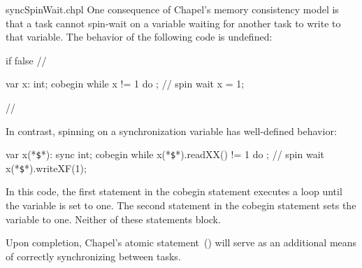 \begin{chapelexample}{syncSpinWait.chpl}
One consequence of Chapel's memory consistency model is that a task cannot spin-wait on a
variable waiting for another task to write to that variable.  The behavior of
the following code is undefined:

\begin{chapelpre}
if false { // }
\end{chapelpre}
\begin{chapel}
var x: int;
cobegin {
  while x != 1 do ;  // spin wait
  x = 1;
}
\end{chapel}
\begin{chapelnoprint}
// {
}
\end{chapelnoprint}
In contrast, spinning on a synchronization variable has well-defined
behavior:
\begin{chapel}
var x(*\texttt{\$}*): sync int;
cobegin {
  while x(*\texttt{\$}*).readXX() != 1 do ;  // spin wait
  x(*\texttt{\$}*).writeXF(1);
}
\end{chapel}
\begin{chapeloutput}
\end{chapeloutput}

In this code, the first statement in the cobegin statement executes a
loop until the variable is set to one.  The second statement in the
cobegin statement sets the variable to one.  Neither of these
statements block.
\end{chapelexample}


\begin{future}
Upon completion, Chapel's atomic statement~() will serve as
an additional means of correctly synchronizing between tasks.
\end{future}

